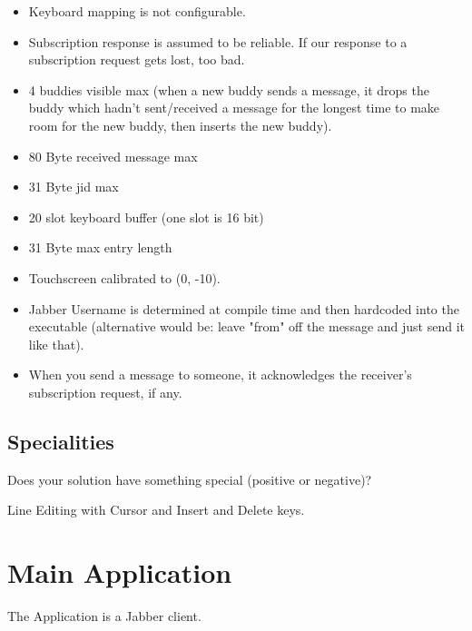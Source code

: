 \documentclass[12pt,a4paper,titlepage,oneside]{article}
\begin{document}
\begin{itemize}
\item Keyboard mapping is not configurable.

\item Subscription response is assumed to be reliable. If our response to a
subscription request gets lost, too bad.

\item 4 buddies visible max (when a new buddy sends a message, it drops the buddy
which hadn't sent/received a message for the longest time to make room for the new buddy,
then inserts the new buddy).

\item 80 Byte received message max
\item 31 Byte jid max
\item 20 slot keyboard buffer (one slot is 16 bit)
\item 31 Byte max entry length
\item Touchscreen calibrated to (0, -10).
\item Jabber Username is determined at compile time and then hardcoded into the executable
(alternative would be: leave "from" off the message and just send it like
that).\par
\item When you send a message to someone, it acknowledges the receiver's subscription request, if any.\par
\end{itemize}

\subsection{Specialities}

Does your solution have something special (positive or negative)?

Line Editing with Cursor and Insert and Delete keys.

\section{Main Application}

The Application is a Jabber client.\par
\end{document}
